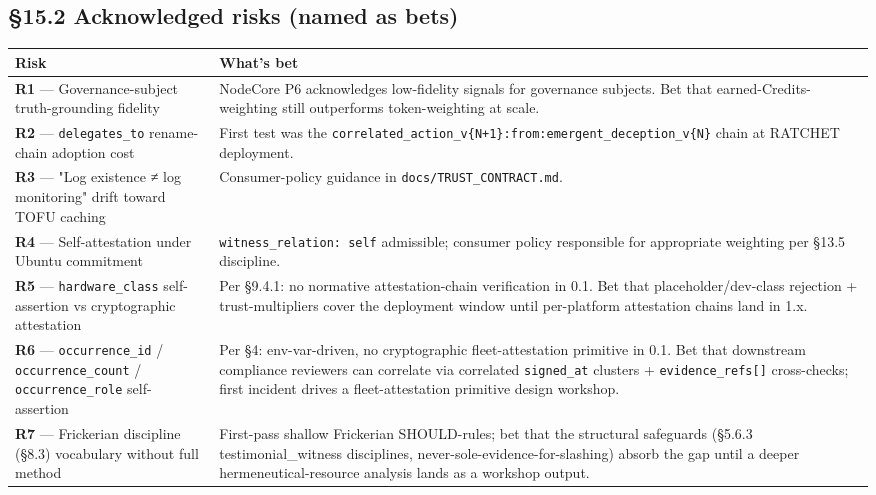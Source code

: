 \documentclass[11pt]{article}
\begin{document}
\subsection*{§15.2 Acknowledged risks (named as bets)}


{\footnotesize
\begin{longtable}{|p{8.0cm}|p{8.0cm}|}\hline
\textbf{Risk} & \textbf{What's bet} \\ \hline\endhead
\textbf{R1} — Governance-subject truth-grounding fidelity & NodeCore P6 acknowledges low-fidelity signals for governance subjects. Bet that earned-Credits-weighting still outperforms token-weighting at scale. \\ \hline
\textbf{R2} — \texttt{delegates\_to} rename-chain adoption cost & First test was the \texttt{correlated\_action\_v\{N+1\}:from:emergent\_deception\_v\{N\}} chain at RATCHET deployment. \\ \hline
\textbf{R3} — "Log existence ≠ log monitoring" drift toward TOFU caching & Consumer-policy guidance in \texttt{docs/TRUST\_CONTRACT.md}. \\ \hline
\textbf{R4} — Self-attestation under Ubuntu commitment & \texttt{witness\_relation: self} admissible; consumer policy responsible for appropriate weighting per §13.5 discipline. \\ \hline
\textbf{R5} — \texttt{hardware\_class} self-assertion vs cryptographic attestation & Per §9.4.1: no normative attestation-chain verification in 0.1. Bet that placeholder/dev-class rejection + trust-multipliers cover the deployment window until per-platform attestation chains land in 1.x. \\ \hline
\textbf{R6} — \texttt{occurrence\_id} / \texttt{occurrence\_count} / \texttt{occurrence\_role} self-assertion & Per §4: env-var-driven, no cryptographic fleet-attestation primitive in 0.1. Bet that downstream compliance reviewers can correlate via correlated \texttt{signed\_at} clusters + \texttt{evidence\_refs[]} cross-checks; first incident drives a fleet-attestation primitive design workshop. \\ \hline
\textbf{R7} — Frickerian discipline (§8.3) vocabulary without full method & First-pass shallow Frickerian SHOULD-rules; bet that the structural safeguards (§5.6.3 testimonial\_witness disciplines, never-sole-evidence-for-slashing) absorb the gap until a deeper hermeneutical-resource analysis lands as a workshop output. \\ \hline

\end{longtable}}
\end{document}
